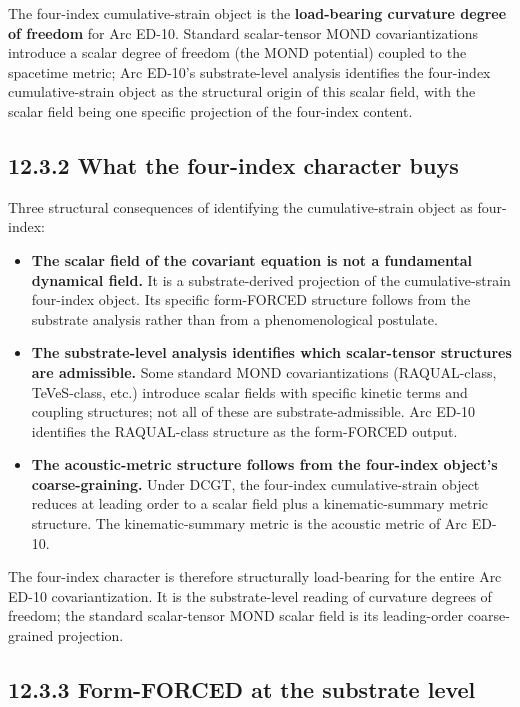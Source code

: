 \documentclass[11pt]{book}
\begin{document}
The four-index cumulative-strain object is the \textbf{load-bearing curvature degree of freedom} for Arc ED-10. Standard scalar-tensor MOND covariantizations introduce a scalar degree of freedom (the MOND potential) coupled to the spacetime metric; Arc ED-10's substrate-level analysis identifies the four-index cumulative-strain object as the structural origin of this scalar field, with the scalar field being one specific projection of the four-index content.

\subsection{12.3.2 What the four-index character buys}

Three structural consequences of identifying the cumulative-strain object as four-index:

\begin{itemize}
\item \textbf{The scalar field of the covariant equation is not a fundamental dynamical field.} It is a substrate-derived projection of the cumulative-strain four-index object. Its specific form-FORCED structure follows from the substrate analysis rather than from a phenomenological postulate.
\item \textbf{The substrate-level analysis identifies which scalar-tensor structures are admissible.} Some standard MOND covariantizations (RAQUAL-class, TeVeS-class, etc.) introduce scalar fields with specific kinetic terms and coupling structures; not all of these are substrate-admissible. Arc ED-10 identifies the RAQUAL-class structure as the form-FORCED output.
\item \textbf{The acoustic-metric structure follows from the four-index object's coarse-graining.} Under DCGT, the four-index cumulative-strain object reduces at leading order to a scalar field plus a kinematic-summary metric structure. The kinematic-summary metric is the acoustic metric of Arc ED-10.
\end{itemize}

The four-index character is therefore structurally load-bearing for the entire Arc ED-10 covariantization. It is the substrate-level reading of curvature degrees of freedom; the standard scalar-tensor MOND scalar field is its leading-order coarse-grained projection.

\subsection{12.3.3 Form-FORCED at the substrate level}
\end{document}
